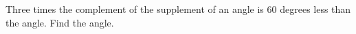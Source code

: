 Three times the complement of the supplement of an angle is 60 degrees less than the angle. Find the angle.
